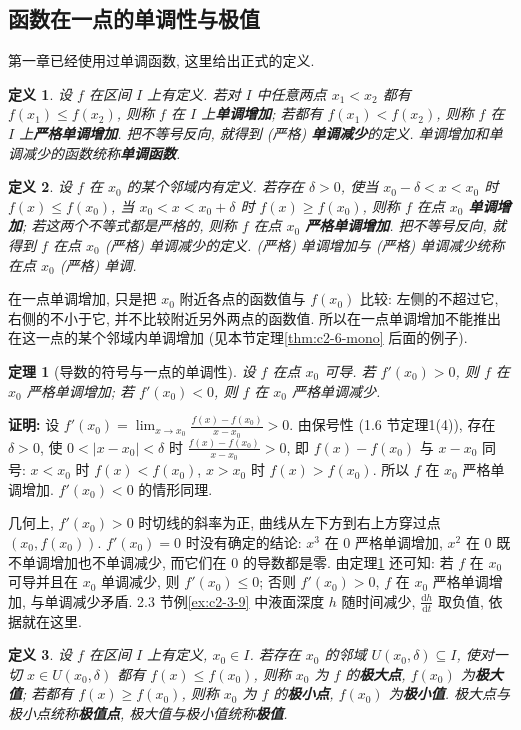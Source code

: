 \documentclass[UTF8,openany]{ctexbook}
\theoremstyle{chinesetextbook}
\newtheorem{definition}{定义}[section]
\newtheorem{theorem}{定理}[section]
\newenvironment{cnproof}{\par\indent\textbf{证明:} \ignorespaces}{\par}
\newcommand{\dd}{\mathrm d}
\begin{document}
\subsection{函数在一点的单调性与极值}
第一章已经使用过单调函数, 这里给出正式的定义.
\begin{definition}
设 $f$ 在区间 $I$ 上有定义. 若对 $I$ 中任意两点 $x_1<x_2$ 都有 $f(x_1)\le f(x_2)$, 则称 $f$ 在 $I$ 上\textbf{单调增加}; 若都有 $f(x_1)<f(x_2)$, 则称 $f$ 在 $I$ 上\textbf{严格单调增加}. 把不等号反向, 就得到 (严格) \textbf{单调减少}的定义. 单调增加和单调减少的函数统称\textbf{单调函数}.
\end{definition}
\begin{definition}
设 $f$ 在 $x_0$ 的某个邻域内有定义. 若存在 $\delta>0$, 使当 $x_0-\delta<x<x_0$ 时 $f(x)\le f(x_0)$, 当 $x_0<x<x_0+\delta$ 时 $f(x)\ge f(x_0)$, 则称 $f$ 在点 $x_0$ \textbf{单调增加}; 若这两个不等式都是严格的, 则称 $f$ 在点 $x_0$ \textbf{严格单调增加}. 把不等号反向, 就得到 $f$ 在点 $x_0$ (严格) 单调减少的定义. (严格) 单调增加与 (严格) 单调减少统称在点 $x_0$ (严格) 单调.
\end{definition}
在一点单调增加, 只是把 $x_0$ 附近各点的函数值与 $f(x_0)$ 比较: 左侧的不超过它, 右侧的不小于它, 并不比较附近另外两点的函数值. 所以在一点单调增加不能推出在这一点的某个邻域内单调增加 (见本节定理\ref{thm:c2-6-mono} 后面的例子).
\begin{theorem}[导数的符号与一点的单调性]\label{thm:c2-6-point}
设 $f$ 在点 $x_0$ 可导. 若 $f'(x_0)>0$, 则 $f$ 在 $x_0$ 严格单调增加; 若 $f'(x_0)<0$, 则 $f$ 在 $x_0$ 严格单调减少.
\end{theorem}
\begin{cnproof}
设 $\displaystyle f'(x_0)=\lim_{x\to x_0}\frac{f(x)-f(x_0)}{x-x_0}>0$. 由保号性 (1.6 节定理1(4)), 存在 $\delta>0$, 使 $0<|x-x_0|<\delta$ 时 $\displaystyle\frac{f(x)-f(x_0)}{x-x_0}>0$, 即 $f(x)-f(x_0)$ 与 $x-x_0$ 同号: $x<x_0$ 时 $f(x)<f(x_0)$, $x>x_0$ 时 $f(x)>f(x_0)$. 所以 $f$ 在 $x_0$ 严格单调增加. $f'(x_0)<0$ 的情形同理.
\end{cnproof}
几何上, $f'(x_0)>0$ 时切线的斜率为正, 曲线从左下方到右上方穿过点 $(x_0,f(x_0))$. $f'(x_0)=0$ 时没有确定的结论: $x^3$ 在 $0$ 严格单调增加, $x^2$ 在 $0$ 既不单调增加也不单调减少, 而它们在 $0$ 的导数都是零. 由定理\ref{thm:c2-6-point} 还可知: 若 $f$ 在 $x_0$ 可导并且在 $x_0$ 单调减少, 则 $f'(x_0)\le0$; 否则 $f'(x_0)>0$, $f$ 在 $x_0$ 严格单调增加, 与单调减少矛盾. 2.3 节例\ref{ex:c2-3-9} 中液面深度 $h$ 随时间减少, $\displaystyle\frac{\dd h}{\dd t}$ 取负值, 依据就在这里.
\begin{definition}
设 $f$ 在区间 $I$ 上有定义, $x_0\in I$. 若存在 $x_0$ 的邻域 $U(x_0,\delta)\subseteq I$, 使对一切 $x\in U(x_0,\delta)$ 都有 $f(x)\le f(x_0)$, 则称 $x_0$ 为 $f$ 的\textbf{极大点}, $f(x_0)$ 为\textbf{极大值}; 若都有 $f(x)\ge f(x_0)$, 则称 $x_0$ 为 $f$ 的\textbf{极小点}, $f(x_0)$ 为\textbf{极小值}. 极大点与极小点统称\textbf{极值点}, 极大值与极小值统称\textbf{极值}.
\end{definition}
\end{document}
